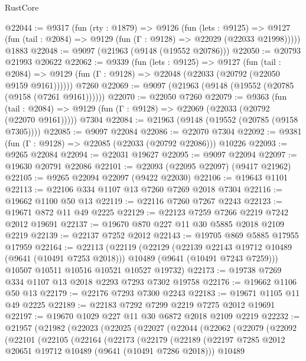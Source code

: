 \begin{lexlean}{RustCore}
\begin{coremodule}
@22044 := @9317
    (fun (rty : @1879) =>
    @9126
      (fun (lets : @9125) =>
      @9127 (fun (tail : @2084) => @9129 (fun (Γ : @9128) => @22029 (@22033 @21998)))))
    @1883
@22048 := @9097 (@21963 (@9148 (@19552 @20786)))
@22050 := @20793 @21993 @20622
@22062 := @9339
    (fun (lets : @9125) =>
    @9127
      (fun (tail : @2084) =>
      @9129 (fun (Γ : @9128) => @22048 (@22033 (@20792 (@22050 @9159 @9161))))))
    @7260
@22069 := @9097 (@21963 (@9148 (@19552 (@20785 (@9158 (@7261 @9161))))))
@22070 := @22050 @7260
@22079 := @9363
    (fun (tail : @2084) => @9129 (fun (Γ : @9128) => @22069 (@22033 (@20792 (@22070 @9161)))))
    @7304
@22084 := @21963 (@9148 (@19552 (@20785 (@9158 @7305))))
@22085 := @9097 @22084
@22086 := @22070 @7304
@22092 := @9381 (fun (Γ : @9128) => @22085 (@22033 (@20792 @22086))) @10226
@22093 := @9265 @22084
@22094 := @22031 @19627
@22095 := @9097 @22094
@22097 := @19630 @20791 @22086
@22101 := @22093 (@22095 @22097) (@9417 @21962)
@22105 := @9265 @22094 @22097 (@9422 @22030)
@22106 := @19643 @1101
@22113 := @22106 @334 @1107 @13 @7260 @7269 @2018 @7304
@22116 := @19662 @1100 @50 @13
@22119 := @22116 @7260 @7267 @2243
@22123 := @19671 @872 @11 @49 @2225
@22129 := @22123 @7259 @7266 @2219 @7242 @2012 @19691
@22137 := @19670 @870 @227 @11 @30 @5885 @2018 @2109 @2219
@22139 := @22137 @7252 @2012
@22143 := @19705 @869 @5885 @17955 @17959
@22164 := @22113
    (@22119
      (@22129
        (@22139 @22143 @19712 @10489 (@9641 (@10491 @7253 @2018)))
        @10489
        (@9641 (@10491 @7243 @7259)))
      @10507
      @10511
      @10516
      @10521
      @10527
      @19732)
@22173 := @19738 @7269 @334 @1107 @13 @2018 @2293 @7293 @7302 @19758
@22176 := @19662 @1106 @50 @13
@22179 := @22176 @7293 @7300 @2243
@22183 := @19671 @1105 @11 @49 @2225
@22189 := @22183 @7292 @7299 @2219 @7275 @2012 @19691
@22197 := @19670 @1029 @227 @11 @30 @6872 @2018 @2109 @2219
@22232 := @21957
    (@21982
      (@22023
        (@22025
          (@22027
            (@22044
              (@22062
                (@22079
                  (@22092
                    (@22101
                      (@22105
                        (@22164
                          (@22173
                            (@22179
                              (@22189
                                (@22197
                                  @7285
                                  @2012
                                  @20651
                                  @19712
                                  @10489
                                  (@9641 (@10491 @7286 @2018)))
                                @10489

\end{coremodule}
\end{lexlean}
